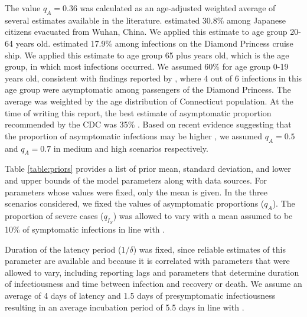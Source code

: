 \documentclass[11pt]{article}
\begin{document}
The value $q_A = 0.36$ was calculated as an age-adjusted weighted average of several estimates available in the literature.  
\citet{nishiura2020estimation} estimated 30.8\% among Japanese citizens evacuated from Wuhan, China. We applied this estimate to age group 20-64 years old.  
\citet{mizumoto2020estimating} estimated 17.9\% among infections on the Diamond Princess cruise ship. We applied this estimate to age group 65 plus years old, which is the age group, in which most infections occurred.
We assumed 60\% for age group 0-19 years old, consistent with findings reported by \citet{russell2020estimating}, where 4 out of 6 infections in this age group were asymptomatic among passengers of the Diamond Princess. 
The average was weighted by the age distribution of Connecticut population. 
At the time of writing this report, the best estimate of asymptomatic proportion recommended by the CDC was 35\% \citep{cdc2020scenarios}.
Based on recent evidence suggesting that the proportion of asymptomatic infections may be higher \citep{he2020estimation, emery2020contribution, kimball2020asymptomatic, lavezzo2020suppression, campbell2020prevalence, dingens2020seroprevalence}, we assumed $q_A = 0.5$ and $q_A = 0.7$ in medium and high scenarios respectively.  

Table \ref{table:priors} provides a list of prior mean, standard deviation, and lower and upper bounds of the model parameters along with data sources. For parameters whose values were fixed, only the mean is given. In the three scenarios considered, we fixed the values of asymptomatic proportions ($q_A$). The proportion of severe cases ($q_{I_S}$) was allowed to vary with a mean assumed to be 10\% of symptomatic infections in line with \citep{verity2020estimates, bi2020epidemiology, salje2020estimating, lane2020country}. 

Duration of the latency period ($1/\delta$) was fixed, since reliable estimates of this parameter are available and because it is correlated with parameters that were allowed to vary, including reporting lags and parameters that determine duration of infectiousness and time between infection and recovery or death. We assume an average of 4 days of latency \citep{li2020substantial, salje2020estimating} and 1.5 days of presymptomatic infectiousness \citep{wei2020presymptomatic} resulting in an average incubation period of 5.5 days in line with \citep{lauer2020incubation, bi2020epidemiology, li2020early, linton2020incubation, he2020estimation, salje2020estimating, cdc2020scenarios}. 
\end{document}
